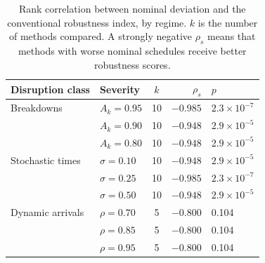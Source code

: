 \begin{table}[t]
\caption{Rank correlation between nominal deviation and the conventional robustness index, by regime. $k$ is the number of methods compared. A strongly negative $\rho_s$ means that methods with worse nominal schedules receive better robustness scores.}\label{tbl:artifact}
\begin{tabular*}{\tblwidth}{@{}LLcrl@{}}
\toprule
Disruption class & Severity & $k$ & $\rho_s$ & $p$ \\
\midrule
Breakdowns & $A_k=0.95$ & 10 & $-0.985$ & $2.3\times10^{-7}$ \\
 & $A_k=0.90$ & 10 & $-0.948$ & $2.9\times10^{-5}$ \\
 & $A_k=0.80$ & 10 & $-0.948$ & $2.9\times10^{-5}$ \\
Stochastic times & $\sigma=0.10$ & 10 & $-0.948$ & $2.9\times10^{-5}$ \\
 & $\sigma=0.25$ & 10 & $-0.985$ & $2.3\times10^{-7}$ \\
 & $\sigma=0.50$ & 10 & $-0.948$ & $2.9\times10^{-5}$ \\
Dynamic arrivals & $\rho=0.70$ & 5 & $-0.800$ & 0.104 \\
 & $\rho=0.85$ & 5 & $-0.800$ & 0.104 \\
 & $\rho=0.95$ & 5 & $-0.800$ & 0.104 \\
\bottomrule
\end{tabular*}
\end{table}
